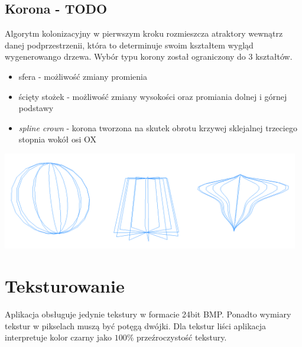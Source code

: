 \subsection{Korona - TODO}
Algorytm kolonizacyjny w pierwszym kroku rozmieszcza atraktory wewnątrz danej podprzestrzenii, która to determinuje swoim kształtem wygląd wygenerowango drzewa. Wybór typu korony został ograniczony do 3 kształtów.
\begin{itemize}
	\item{sfera - możliwość zmiany promienia}
	\item{ścięty stożek - możliwość zmiany wysokości oraz promiania dolnej i górnej podstawy}
	\item{\textit{spline crown} - korona tworzona na skutek obrotu krzywej sklejalnej trzeciego stopnia wokół osi OX}
\end{itemize}

\begin{center}
	\includegraphics[width=130mm]{images/model/crowns.png}
	\label{crowns}
\end{center}

\section{Teksturowanie}
Aplikacja obsługuje jedynie tekstury w formacie 24bit BMP. 
Ponadto wymiary tekstur w pikselach muszą być potęgą dwójki.
Dla tekstur liści aplikacja interpretuje kolor czarny jako ${100\%}$ przeźroczystość tekstury.

